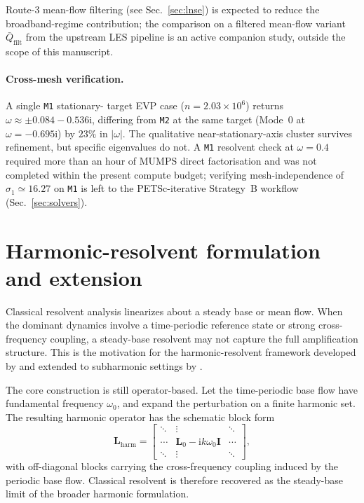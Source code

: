 \documentclass[11pt]{article}
\newcommand{\bI}{\mathbf{I}}
\newcommand{\bL}{\mathbf{L}}
\begin{document}
Route-3 mean-flow filtering (see Sec.~\ref{sec:lnse}) is expected to
reduce the broadband-regime contribution; the comparison on a
filtered mean-flow variant $\bar{Q}_{\text{filt}}$ from the upstream
LES pipeline is an active companion study, outside the scope of this
manuscript.

\paragraph{Cross-mesh verification.} A single \texttt{M1} stationary-
target EVP case ($n = 2.03\times 10^6$) returns
$\omega \approx \pm 0.084 - 0.536\mathrm{i}$, differing from
\texttt{M2} at the same target (Mode~0 at $\omega = -0.695\mathrm{i}$)
by $23\%$ in $|\omega|$. The qualitative near-stationary-axis cluster
survives refinement, but specific eigenvalues do not. A \texttt{M1}
resolvent check at $\omega = 0.4$ required more than an hour of
MUMPS direct factorisation and was not completed within the
present compute budget; verifying mesh-independence of $\sigma_1
\simeq 16.27$ on \texttt{M1} is left to the PETSc-iterative Strategy~B
workflow (Sec.~\ref{sec:solvers}).

\section{Harmonic-resolvent formulation and extension}
\label{sec:harmonic_extension}

Classical resolvent analysis linearizes about a steady base or mean flow. When
the dominant dynamics involve a time-periodic reference state or strong
cross-frequency coupling, a steady-base resolvent may not capture the full
amplification structure. This is the motivation for the harmonic-resolvent
framework developed by \citet{padovan2020harmonic} and extended to subharmonic
settings by \citet{padovan2022subharmonic}.

The core construction is still operator-based. Let the time-periodic base flow
have fundamental frequency $\omega_0$, and expand the perturbation on a finite
harmonic set. The resulting harmonic operator has the schematic block form
\begin{equation}
  \bL_{\mathrm{harm}} =
  \begin{bmatrix}
    \ddots & \vdots & \ddots \\
    \cdots & \bL_0 - \mathrm{i}k\omega_0 \bI & \cdots \\
    \ddots & \vdots & \ddots
  \end{bmatrix},
\end{equation}
with off-diagonal blocks carrying the cross-frequency coupling induced by the
periodic base flow. Classical resolvent is therefore recovered as the
steady-base limit of the broader harmonic formulation.
\end{document}
